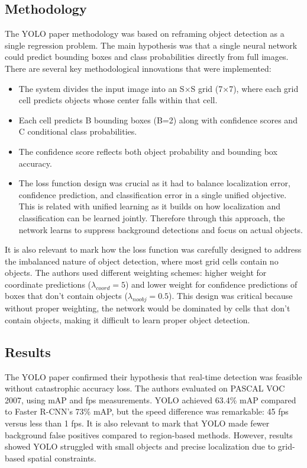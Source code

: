 \documentclass[12pt]{article}
\begin{document}
\vspace{0.5cm}

\subsection*{Methodology}

The YOLO paper methodology was based on reframing object detection as a single regression problem. The main hypothesis 
was that a single neural network could predict bounding boxes and class probabilities directly from full images. There are several key methodological 
innovations that were implemented:
\begin{itemize}
    \item The system divides the input image into an S×S grid (7×7), where each grid cell predicts objects whose center falls within that cell.
    \item Each cell predicts B bounding boxes (B=2) along with confidence scores and C conditional class probabilities.
    \item The confidence score reflects both object probability and bounding box accuracy.
    \item The loss function design was crucial as it had to balance localization error, confidence prediction, and classification error in a single unified objective.
This is related with unified learning as it builds on how localization and classification can be learned jointly.
Therefore through this approach, the network learns to suppress background detections and focus on actual objects.
\end{itemize}

\vspace{0.5cm}

It is also relevant to mark how the loss function was carefully designed to address the imbalanced nature of object detection, where most grid cells contain no objects. 
The authors used different weighting schemes: higher weight for coordinate predictions (\(\lambda_{coord} = 5\)) and lower weight for confidence predictions of boxes that don't contain objects (\(\lambda_{noobj} = 0.5\)). 
This design was critical because without proper weighting, the network would be dominated by cells that don't contain objects, making it difficult to learn proper object detection.

\vspace{0.5cm}

\subsection*{Results}

The YOLO paper confirmed their hypothesis that real-time detection was feasible without catastrophic accuracy loss. The authors evaluated on PASCAL VOC 2007, using mAP and fps measurements. 
YOLO achieved 63.4\% mAP compared to Faster R-CNN's 73\% mAP, but the speed difference was remarkable: 45 fps versus less than 1 fps. 
It is also relevant to mark that YOLO made fewer background false positives compared to region-based methods. However, results showed YOLO struggled 
with small objects and precise localization due to grid-based spatial constraints.
\end{document}
